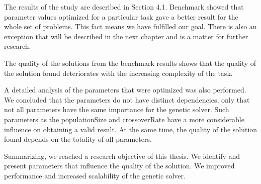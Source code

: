 The results of the study are described in Section 4.1.
Benchmark showed that parameter values optimized for a particular task gave a better result for the whole set of problems. This fact means we have fulfilled our goal. There is also an exception that will be described in the next chapter and is a matter for further research.

The quality of the solutions from the benchmark results shows that the quality of the solution found deteriorates with the increasing complexity of the task.

A detailed analysis of the parameters that were optimized was also performed. We concluded that the parameters do not have distinct dependencies, only that not all parameters have the same importance for the genetic solver. Such parameters as the populationSize and crossoverRate have a more considerable influence on obtaining a valid result. At the same time, the quality of the solution found depends on the totality of all parameters.

Summarizing, we reached a research objective of this thesis. We identify and present parameters that influence the quality of the solution. We improved performance and increased scalability of the genetic solver.



